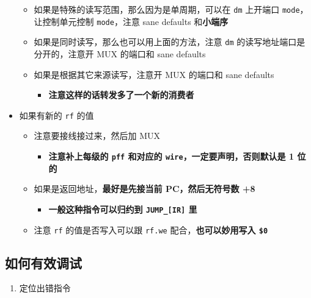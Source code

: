\documentclass[12pt,AutoFakeBold,AutoFakeSlant]{article}
\providecommand{\tightlist}{%
  \setlength{\itemsep}{0pt}\setlength{\parskip}{0pt}}
\begin{document}
\begin{itemize}
  \begin{itemize}
  \tightlist
  \item
    如果是特殊的读写范围，那么因为是单周期，可以在 \texttt{dm} 上开端口
    \texttt{mode}，让控制单元控制 \texttt{mode}，注意 sane defaults
    和\textbf{小端序}
  \item
    如果是同时读写，那么也可以用上面的方法，注意 \texttt{dm}
    的读写地址端口是分开的，注意开 MUX 的端口和 sane defaults
  \item
    如果是根据其它来源读写，注意开 MUX 的端口和 sane defaults

    \begin{itemize}
    \tightlist
    \item
      \textbf{注意这样的话转发多了一个新的消费者}
    \end{itemize}
  \end{itemize}
\item
  如果有新的 \texttt{rf} 的值

  \begin{itemize}
  \tightlist
  \item
    注意要接线接过来，然后加 MUX

    \begin{itemize}
    \tightlist
    \item
      \textbf{注意补上每级的 \texttt{pff} 和对应的
      \texttt{wire}，一定要声明，否则默认是 1 位的}
    \end{itemize}
  \item
    如果是返回地址，\textbf{最好是先接当前 PC，然后无符号数 +8}

    \begin{itemize}
    \tightlist
    \item
      \textbf{一般这种指令可以归约到 \texttt{JUMP\_{[}IR{]}} 里}
    \end{itemize}
  \item
    注意 \texttt{rf} 的值是否写入可以跟 \texttt{rf.we}
    配合，\textbf{也可以妙用写入 \texttt{\$0}}
  \end{itemize}
\end{itemize}

\hypertarget{ux5982ux4f55ux6709ux6548ux8c03ux8bd5}{%
\subsection{如何有效调试}\label{ux5982ux4f55ux6709ux6548ux8c03ux8bd5}}

\begin{enumerate}
\def\labelenumi{\arabic{enumi}.}
\tightlist
\item
  定位出错指令
\end{enumerate}
\end{document}
